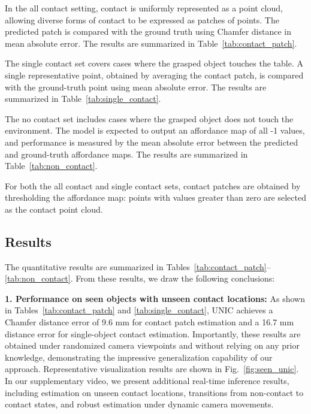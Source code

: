 \documentclass[letterpaper, 10 pt, conference]{ieeeconf}  %
\newcommand{\unic}{\textsc{UNIC}}
\begin{document}
In the all contact setting, contact is uniformly represented as a point cloud, allowing diverse forms of contact to be expressed as patches of points. The predicted patch is compared with the ground truth using Chamfer distance in mean absolute error. The results are summarized in Table~\ref{tab:contact_patch}.

The single contact set covers cases where the grasped object touches the table. A single representative point, obtained by averaging the contact patch, is compared with the ground-truth point using mean absolute error. The results are summarized in Table~\ref{tab:single_contact}.

The no contact set includes cases where the grasped object does not touch the environment. The model is expected to output an affordance map of all -1 values, and performance is measured by the mean absolute error between the predicted and ground-truth affordance maps. The results are summarized in Table~\ref{tab:non_contact}.

For both the all contact and single contact sets, contact patches are obtained by thresholding the affordance map: points with values greater than zero are selected as the contact point cloud.

\subsection{Results}

The quantitative results are summarized in Tables~\ref{tab:contact_patch}–\ref{tab:non_contact}. From these results, we draw the following conclusions:

\textbf{1. Performance on seen objects with unseen contact locations:} As shown in Tables~\ref{tab:contact_patch} and \ref{tab:single_contact}, \unic{} achieves a Chamfer distance error of 9.6 mm for contact patch estimation and a 16.7 mm distance error for single-object contact estimation. Importantly, these results are obtained under randomized camera viewpoints and without relying on any prior knowledge, demonstrating the impressive generalization capability of our approach. Representative visualization results are shown in Fig.~\ref{fig:seen_unic}. In our supplementary video, we present additional real-time inference results, including estimation on unseen contact locations, transitions from non-contact to contact states, and robust estimation under dynamic camera movements.
\end{document}
